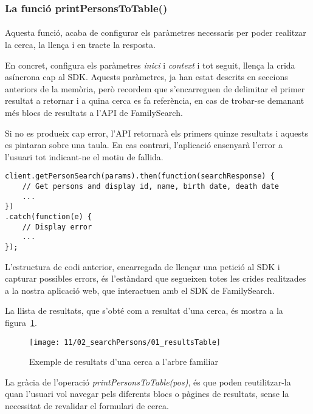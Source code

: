 \subsubsection{La funció printPersonsToTable()}

\paragraph{}
Aquesta funció, acaba de configurar els paràmetres necessaris per poder realitzar la cerca, la llença i en tracte la resposta.

En concret, configura els paràmetres \emph{inici} i \emph{context} i tot seguit, llença la crida asíncrona cap al SDK. Aquests paràmetres, ja han estat descrits en seccions anteriors de la memòria, però recordem que s'encarreguen de delimitar el primer resultat a retornar i a quina cerca es fa referència, en cas de trobar-se demanant més blocs de resultats a l'API de FamilySearch.

Si no es produeix cap error, l'API retornarà els primers quinze resultats i aquests es pintaran sobre una taula. En cas contrari, l'aplicació ensenyarà l'error a l'usuari tot indicant-ne el motiu de fallida.

\begin{lstlisting}[style=rawOwn,caption={Llençament de peticions contra el SDK i captura d'errors}]
client.getPersonSearch(params).then(function(searchResponse) {
    // Get persons and display id, name, birth date, death date
    ...
})
.catch(function(e) {
    // Display error
    ...
});
\end{lstlisting}

L'estructura de codi anterior, encarregada de llençar una petició al SDK i capturar possibles errors, és l'estàndard que segueixen totes les crides realitzades a la nostra aplicació web, que interactuen amb el SDK de FamilySearch.

La llista de resultats, que s'obté com a resultat d'una cerca, és mostra a la figura~\ref{fig:searchTableResults}.

\begin{figure}[h]
    \texttt{[image: 11/02\_searchPersons/01\_resultsTable]}
    \centering
    \caption{Exemple de resultats d'una cerca a l'arbre familiar}\label{fig:searchTableResults}
\end{figure}

La gràcia de l'operació \emph{printPersonsToTable(pos)}, és que poden reutilitzar-la quan l'usuari vol navegar pels diferents blocs o pàgines de resultats, sense la necessitat de revalidar el formulari de cerca.

